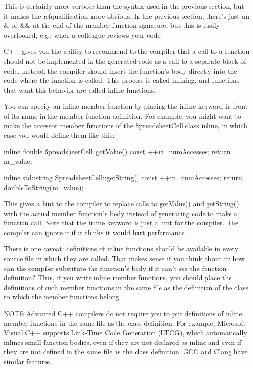 This is certainly more verbose than the syntax used in the previous section, but it makes the refqualification more obvious. In the previous section, there’s just an \& or \&\& at the end of the member function signature, but this is easily overlooked, e.g., when a colleague reviews your code.


C++ gives you the ability to recommend to the compiler that a call to a function should not be implemented in the generated code as a call to a separate block of code. Instead, the compiler should insert the function’s body directly into the code where the function is called. This process is called inlining, and functions that want this behavior are called inline functions.

You can specify an inline member function by placing the inline keyword in front of its name in the member function definition. For example, you might want to make the accessor member functions of the SpreadsheetCell class inline, in which case you would define them like this:

\begin{cpp}
inline double SpreadsheetCell::getValue() const
{
    ++m_numAccesses;
    return m_value;
}

inline std::string SpreadsheetCell::getString() const
{
    ++m_numAccesses;
    return doubleToString(m_value);
}
\end{cpp}

This gives a hint to the compiler to replace calls to getValue() and getString() with the actual member function’s body instead of generating code to make a function call. Note that the inline keyword is just a hint for the compiler. The compiler can ignore it if it thinks it would hurt performance.

There is one caveat: definitions of inline functions should be available in every source file in which they are called. That makes sense if you think about it: how can the compiler substitute the function’s body if it can’t see the function definition? Thus, if you write inline member functions, you should place the definitions of such member functions in the same file as the definition of the class to which the member functions belong.

\begin{myNotic}{NOTE}
Advanced C++ compilers do not require you to put definitions of inline member functions in the same file as the class definition. For example, Microsoft Visual C++ supports Link-Time Code Generation (LTCG), which automatically inlines small function bodies, even if they are not declared as inline and even if they are not defined in the same file as the class definition. GCC and Clang have similar features.
\end{myNotic}

